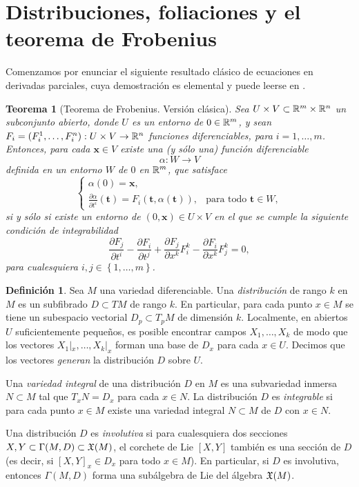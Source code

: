 \documentclass[11pt,a4paper]{amsbook}
\newtheorem{thm}[subsection]{Teorema}
\theoremstyle{remark} \newtheorem{rmk}[subsection]{Observación}
\theoremstyle{definition} \newtheorem{defn}[subsection]{Definición}
\theoremstyle{definition} \newtheorem{ex}[subsection]{Ejemplo}
\theoremstyle{definition} \newtheorem{ej}[subsection]{Ejercicio}
\begin{document}
\section{Distribuciones, foliaciones y el teorema de Frobenius}

Comenzamos por enunciar el siguiente resultado clásico de ecuaciones en derivadas parciales, cuya demostración es elemental y puede leerse en .

\begin{thm}[Teorema de Frobenius. Versión clásica]
  Sea $U\times V \subset \mathbb R^m \times \mathbb R^n$ un subconjunto abierto, donde $U$ es un entorno de $0\in \mathbb R^m$, y sean $F_i=(F_i^1,\dots,F_i^n):U\times V \rightarrow \mathbb R^n$ funciones diferenciables, para $i=1,\dots,m$. Entonces, para cada $\bm{x}\in V$ existe una (y sólo una) función diferenciable
  \begin{equation*}
\alpha : W\rightarrow V
  \end{equation*}
  definida en un entorno $W$ de $0$ en $\mathbb R^m$, que satisface
  \begin{equation*}
\begin{cases}
  \alpha(0) = \bm{x}, \\
  \frac{\partial \alpha}{\partial t^i} (\bm{t}) = F_i(\bm{t},\alpha(\bm{t})), & \text{para todo } \bm{t}\in W,
\end{cases}
  \end{equation*}
si y sólo si existe un entorno de $(0,\bm{x})\in U\times V$ en el que se cumple la siguiente \emph{condición de integrabilidad}
\begin{equation*}
\frac{\partial F_j}{\partial t^i} - \frac{\partial F_i}{\partial t^j} + \frac{\partial F_j}{\partial x^k} F_i^k - \frac{\partial F_i}{\partial x^k} F_j^k =0,
\end{equation*}
para cualesquiera $i,j \in \left\{ 1,\dots,m \right\}$.
\end{thm}

\begin{defn}
Sea $M$ una variedad diferenciable. Una \emph{distribución} de rango $k$ en $M$ es un subfibrado $D\subset TM$ de rango $k$. En particular, para cada punto $x\in M$ se tiene un subespacio vectorial $D_p\subset T_pM$ de dimensión $k$. Localmente, en abiertos $U$ suficientemente pequeños, es posible encontrar campos $X_1,\dots,X_k$ de modo que los vectores $X_1|_x,\dots,X_k|_x$ forman una base de $D_x$ para cada $x\in U$. Decimos que los vectores \emph{generan} la distribución $D$ sobre $U$.

Una \emph{variedad integral} de una distribución $D$ en $M$ es una subvariedad inmersa $N\subset M$ tal que $T_xN=D_x$ para cada $x\in N$. La distribución $D$ es \emph{integrable} si para cada punto $x\in M$ existe una variedad integral $N\subset M$ de $D$ con $x\in N$.

Una distribución $D$ es \emph{involutiva} si para cualesquiera dos secciones $X,Y \subset \Gamma(M,D) \subset \mathfrak X(M)$, el corchete de Lie $[X,Y]$ también es una sección de $D$ (es decir, si $[X,Y]_x\in D_x$ para todo $x\in M$). En particular, si $D$ es involutiva, entonces $\Gamma(M,D)$ forma una subálgebra de Lie del álgebra $\mathfrak X(M)$.
\end{defn}
\end{document}
